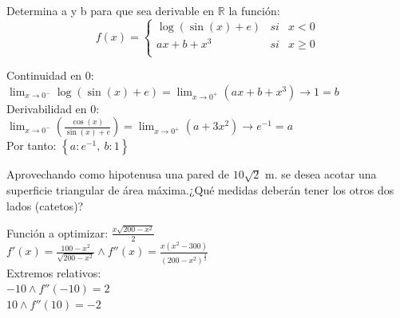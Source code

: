 \documentclass[addpoints,spanish, 12pt,a4paper]{exam}
\begin{document}
\begin{questions}
\addpoints


\question[5] Determina a y b para que sea derivable en $\mathbb{R}$ la función: $$f(x)=\left\{\begin{matrix}
\log{\left(\sin{\left(x \right)} + e \right)} & si & x<0 \\
a x + b + x^{3} & si & x\geqslant 0 \\
\end{matrix}\right.$$ 


\begin{solution}
Continuidad en 0:\\ $\lim_{x \to 0^-} \log{\left(\sin{\left(x \right)} + e \right)} = \lim_{x \to 0^+}\left(a x + b + x^{3}\right) \to 1 = b $ \\ Derivabilidad en 0: \\ $\lim_{x \to 0^-}\left(\frac{\cos{\left(x \right)}}{\sin{\left(x \right)} + e}\right) = \lim_{x \to 0^+}\left(a + 3 x^{2}\right) \to e^{-1} = a $ \\ Por tanto: $\left\{ a : e^{-1}, \  b : 1\right\} $ \\ 
\end{solution}

\addpoints

\question[6] Aprovechando como hipotenusa una pared de $10 \sqrt{2}$ m. se desea acotar una superficie triangular de 
área máxima.¿Qué medidas deberán tener los otros dos lados (catetos)?

\begin{solution}
Función a optimizar: $\frac{x \sqrt{200 - x^{2}}}{2}$ \\ $f'(x)=\frac{100 - x^{2}}{\sqrt{200 - x^{2}}}\land f''(x)=\frac{x \left(x^{2} - 300\right)}{\left(200 - x^{2}\right)^{\frac{3}{2}}}$ \\ Extremos relativos: \\ $-10\land f''(-10)=2$ \\ $10\land f''(10)=-2$ \\
\end{solution}


\end{questions}
\end{document}
